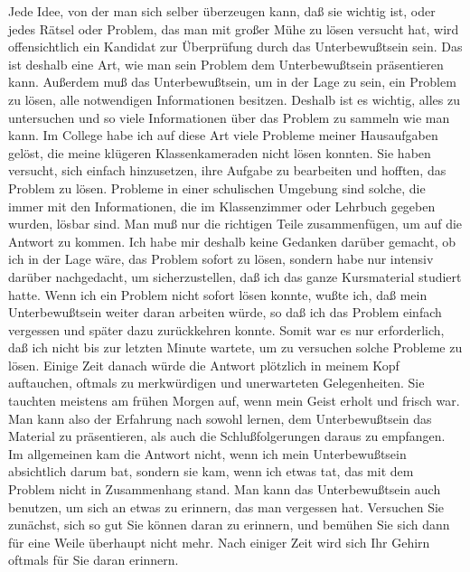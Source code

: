 Jede Idee, von der man sich selber überzeugen kann, daß sie wichtig ist, oder jedes Rätsel oder Problem, das man mit großer Mühe zu lösen versucht hat, wird offensichtlich ein Kandidat zur Überprüfung durch das Unterbewußtsein sein.
Das ist deshalb eine Art, wie man sein Problem dem Unterbewußtsein präsentieren kann.
Außerdem muß das Unterbewußtsein, um in der Lage zu sein, ein Problem zu lösen, alle notwendigen Informationen besitzen.
Deshalb ist es wichtig, alles zu untersuchen und so viele Informationen über das Problem zu sammeln wie man kann.
Im College habe ich auf diese Art viele Probleme meiner Hausaufgaben gelöst, die meine klügeren Klassenkameraden nicht lösen konnten.
Sie haben versucht, sich einfach hinzusetzen, ihre Aufgabe zu bearbeiten und hofften, das Problem zu lösen.
Probleme in einer schulischen Umgebung sind solche, die immer mit den Informationen, die im Klassenzimmer oder Lehrbuch gegeben wurden, lösbar sind.
Man muß nur die richtigen Teile zusammenfügen, um auf die Antwort zu kommen.
Ich habe mir deshalb keine Gedanken darüber gemacht, ob ich in der Lage wäre, das Problem sofort zu lösen, sondern habe nur intensiv darüber nachgedacht, um sicherzustellen, daß ich das ganze Kursmaterial studiert hatte.
Wenn ich ein Problem nicht sofort lösen konnte, wußte ich, daß mein Unterbewußtsein weiter daran arbeiten würde, so daß ich das Problem einfach vergessen und später dazu zurückkehren konnte.
Somit war es nur erforderlich, daß ich nicht bis zur letzten Minute wartete, um zu versuchen solche Probleme zu lösen.
Einige Zeit danach würde die Antwort plötzlich in meinem Kopf auftauchen, oftmals zu merkwürdigen und unerwarteten Gelegenheiten.
Sie tauchten meistens am frühen Morgen auf, wenn mein Geist erholt und frisch war.
Man kann also der Erfahrung nach sowohl lernen, dem Unterbewußtsein das Material zu präsentieren, als auch die Schlußfolgerungen daraus zu empfangen.
Im allgemeinen kam die Antwort nicht, wenn ich mein Unterbewußtsein absichtlich darum bat, sondern sie kam, wenn ich etwas tat, das mit dem Problem nicht in Zusammenhang stand.
Man kann das Unterbewußtsein auch benutzen, um sich an etwas zu erinnern, das man vergessen hat.
Versuchen Sie zunächst, sich so gut Sie können daran zu erinnern, und bemühen Sie sich dann für eine Weile überhaupt nicht mehr.
Nach einiger Zeit wird sich Ihr Gehirn oftmals für Sie daran erinnern.

